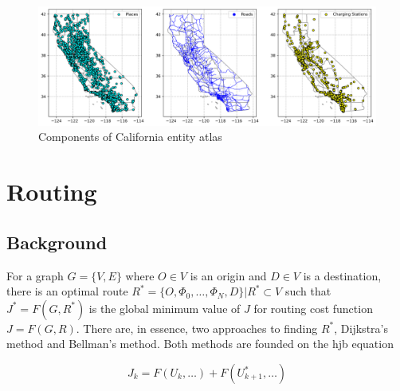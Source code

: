 \documentclass[12pt]{article}
\begin{document}
\begin{figure}[H]
	\centering
	\includegraphics[width = \linewidth]{figs/California_Places_Chargers.png}
	\caption{Components of California entity atlas}
	\label{fig:california_entity_atlas}
\end{figure}

\section*{Routing}

\subsection*{Background}

For a graph $G=\{V,E\}$ where $O\in V$ is an origin and $D\in V$ is a destination, there is an optimal route $R^* = \{O, \Phi_0, \dots, \Phi_N, D\}| R^*\subset V$ such that $J^*=F(G,R^*)$ is the global minimum value of $J$ for routing cost function $J = F(G,R)$. There are, in essence, two approaches to finding $R^*$, Dijkstra's method and Bellman's method. Both methods are founded on the \gls{hjb} equation

\begin{equation}
	J_k = F(U_k,\dots) + F(U^*_{k+1},\dots)
\end{equation}
\end{document}
